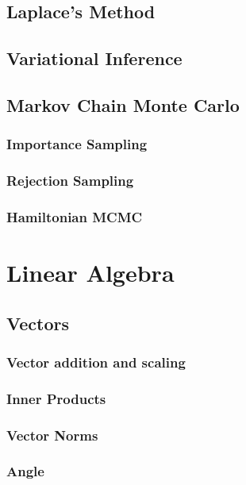 \documentclass[10pt]{article}
\begin{document}
\subsection{Laplace's Method}

\subsection{Variational Inference}

\subsection{Markov Chain Monte Carlo}

\subsubsection{Importance Sampling}

\subsubsection{Rejection Sampling}

\subsubsection{Hamiltonian MCMC}

\section{Linear Algebra}

\subsection{Vectors}

\subsubsection{Vector addition and scaling}

\subsubsection{Inner Products}

\subsubsection{Vector Norms}

\subsubsection{Angle}
\end{document}
